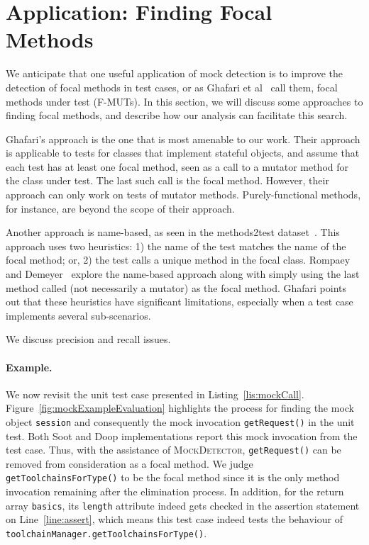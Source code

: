 \section{Application: Finding Focal Methods}
\label{sec:focal}

We anticipate that one useful application of mock detection is to
improve the detection of focal methods in test cases, or as Ghafari et
al~\cite{ghafari15:_autom} call them, focal methods under test
(F-MUTs). In this section, we will discuss some approaches to finding
focal methods, and describe how our analysis can facilitate this search.

Ghafari's approach is the one that is most amenable to our work.
Their approach is applicable to tests for classes that implement
stateful objects, and assume that each test has at least one focal
method, seen as a call to a mutator method for the class under test.
The last such call is the focal method. However, their approach can
only work on tests of mutator methods.  Purely-functional methods, for
instance, are beyond the scope of their approach.

Another approach is name-based, as seen in the methods2test
dataset~\cite{tufano2020unit}.  This approach uses two heuristics: 1)
the name of the test matches the name of the focal method; or, 2) the
test calls a unique method in the focal class. Rompaey and
Demeyer~\cite{rompaey09:_estab_traceab_links_unit_test} explore the
name-based approach along with simply using the last method called
(not necessarily a mutator) as the focal method.  Ghafari points out
that these heuristics have significant limitations, especially when a
test case implements several sub-scenarios.

We discuss precision and recall issues. 

\paragraph{Example.} We now revisit the unit test case presented in Listing~\ref{lis:mockCall}. Figure~\ref{fig:mockExampleEvaluation} highlights the process for finding the mock object \texttt{session} and consequently the mock invocation \texttt{getRequest()} in the unit test. Both Soot and Doop implementations report this mock invocation 
from the test case. Thus, with the assistance of \textsc{MockDetector}, \texttt{getRequest()} can be removed from consideration as a focal method. We judge \texttt{getToolchainsForType()} to be the focal method since it is the only method invocation remaining after the elimination process. In addition, for the return array \texttt{basics}, its \texttt{length} attribute indeed gets checked in the assertion statement on Line~\ref{line:assert}, which means this test case indeed tests the behaviour of \texttt{toolchainManager.getToolchainsForType()}. 


